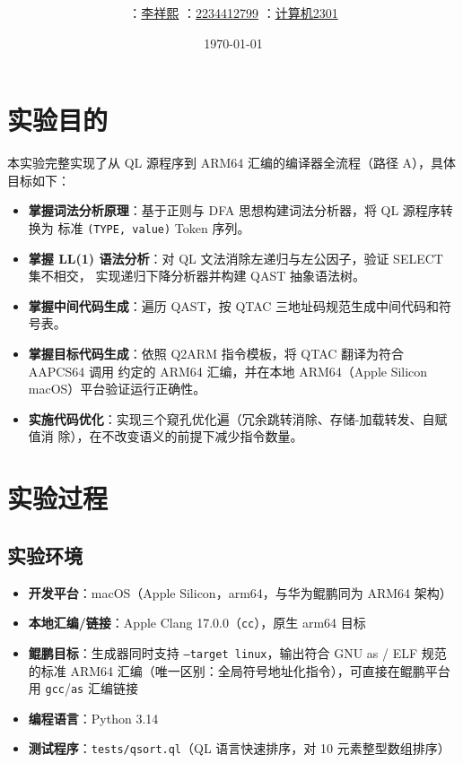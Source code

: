 \documentclass[12pt,a4paper]{ctexart}
\title{\reporttitle\\\large\subtask}
\author{\authname：\underline{李祥熙} \quad \authid：\underline{2234412799} \quad \class：\underline{计算机2301}}
\date{\today}
\begin{document}
\maketitle
\tableofcontents
\newpage

\section{实验目的}

本实验完整实现了从 QL 源程序到 ARM64 汇编的编译器全流程（路径 A），具体目标如下：

\begin{itemize}
  \item \textbf{掌握词法分析原理}：基于正则与 DFA 思想构建词法分析器，将 QL 源程序转换为
        标准 \texttt{(TYPE, value)} Token 序列。
  \item \textbf{掌握 LL(1) 语法分析}：对 QL 文法消除左递归与左公因子，验证 SELECT 集不相交，
        实现递归下降分析器并构建 QAST 抽象语法树。
  \item \textbf{掌握中间代码生成}：遍历 QAST，按 QTAC 三地址码规范生成中间代码和符号表。
  \item \textbf{掌握目标代码生成}：依照 Q2ARM 指令模板，将 QTAC 翻译为符合 AAPCS64 调用
        约定的 ARM64 汇编，并在本地 ARM64（Apple Silicon macOS）平台验证运行正确性。
  \item \textbf{实施代码优化}：实现三个窥孔优化遍（冗余跳转消除、存储-加载转发、自赋值消
        除），在不改变语义的前提下减少指令数量。
\end{itemize}

\section{实验过程}

\subsection{实验环境}

\begin{itemize}
  \item \textbf{开发平台}：macOS（Apple Silicon，arm64，与华为鲲鹏同为 ARM64 架构）
  \item \textbf{本地汇编/链接}：Apple Clang 17.0.0（\texttt{cc}），原生 arm64 目标
  \item \textbf{鲲鹏目标}：生成器同时支持 \texttt{--target linux}，输出符合 GNU as / ELF 规范
        的标准 ARM64 汇编（唯一区别：全局符号地址化指令），可直接在鲲鹏平台用 \texttt{gcc}/\texttt{as} 汇编链接
  \item \textbf{编程语言}：Python 3.14
  \item \textbf{测试程序}：\texttt{tests/qsort.ql}（QL 语言快速排序，对 10 元素整型数组排序）
\end{itemize}
\end{document}
